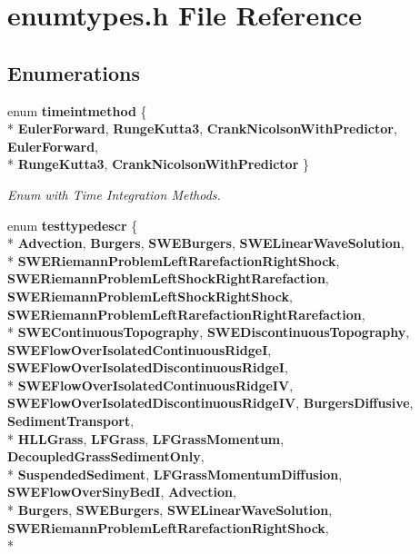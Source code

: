 \section{enumtypes.\-h File Reference}
\label{enumtypes_8h}
\subsection*{Enumerations}
\begin{DoxyCompactItemize}
\item 
enum {\bf timeintmethod} \{ \\*
{\bf Euler\-Forward}, 
{\bf Runge\-Kutta3}, 
{\bf Crank\-Nicolson\-With\-Predictor}, 
{\bf Euler\-Forward}, 
\\*
{\bf Runge\-Kutta3}, 
{\bf Crank\-Nicolson\-With\-Predictor}
 \}
\begin{DoxyCompactList}\small\item\em Enum with Time Integration Methods. \end{DoxyCompactList}\item 
enum {\bf testtypedescr} \{ \\*
{\bf Advection}, 
{\bf Burgers}, 
{\bf S\-W\-E\-Burgers}, 
{\bf S\-W\-E\-Linear\-Wave\-Solution}, 
\\*
{\bf S\-W\-E\-Riemann\-Problem\-Left\-Rarefaction\-Right\-Shock}, 
{\bf S\-W\-E\-Riemann\-Problem\-Left\-Shock\-Right\-Rarefaction}, 
{\bf S\-W\-E\-Riemann\-Problem\-Left\-Shock\-Right\-Shock}, 
{\bf S\-W\-E\-Riemann\-Problem\-Left\-Rarefaction\-Right\-Rarefaction}, 
\\*
{\bf S\-W\-E\-Continuous\-Topography}, 
{\bf S\-W\-E\-Discontinuous\-Topography}, 
{\bf S\-W\-E\-Flow\-Over\-Isolated\-Continuous\-Ridge\-I}, 
{\bf S\-W\-E\-Flow\-Over\-Isolated\-Discontinuous\-Ridge\-I}, 
\\*
{\bf S\-W\-E\-Flow\-Over\-Isolated\-Continuous\-Ridge\-I\-V}, 
{\bf S\-W\-E\-Flow\-Over\-Isolated\-Discontinuous\-Ridge\-I\-V}, 
{\bf Burgers\-Diffusive}, 
{\bf Sediment\-Transport}, 
\\*
{\bf H\-L\-L\-Grass}, 
{\bf L\-F\-Grass}, 
{\bf L\-F\-Grass\-Momentum}, 
{\bf Decoupled\-Grass\-Sediment\-Only}, 
\\*
{\bf Suspended\-Sediment}, 
{\bf L\-F\-Grass\-Momentum\-Diffusion}, 
{\bf S\-W\-E\-Flow\-Over\-Siny\-Bed\-I}, 
{\bf Advection}, 
\\*
{\bf Burgers}, 
{\bf S\-W\-E\-Burgers}, 
{\bf S\-W\-E\-Linear\-Wave\-Solution}, 
{\bf S\-W\-E\-Riemann\-Problem\-Left\-Rarefaction\-Right\-Shock}, 
\\*

\end{DoxyCompactItemize}
